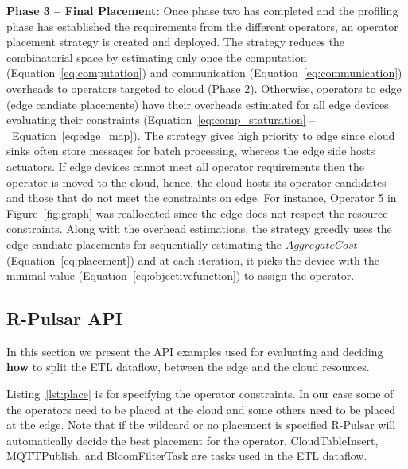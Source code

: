 \begin{algorithm}[ht]
{  
  
    
  
}

\end{algorithm}

\textbf{Phase 3 -- Final Placement:} 
Once phase two has completed and the profiling phase has established the requirements from the different operators, an operator placement strategy is created and deployed. The strategy reduces the combinatorial space by estimating only once the computation (Equation~\ref{eq:computation}) and communication (Equation~\ref{eq:communication}) overheads to operators targeted to cloud (Phase 2). Otherwise, operators to edge (edge candiate placements) have their overheads estimated for all edge devices evaluating their constraints (Equation~\ref{eq:comp_staturation} --~Equation~\ref{eq:edge_map}). The strategy gives high priority to edge since cloud sinks often store messages for batch processing, whereas the edge side hosts actuators.
If edge devices cannot meet all operator requirements then the operator is moved to the cloud, hence, the cloud hosts its operator candidates and those that do not meet the constraints on edge. For instance, Operator 5 in Figure~\ref{fig:graph} was reallocated since the edge does not respect the resource constraints. Along with the overhead estimations, the strategy greedly uses the edge candiate placements for sequentially estimating the $AggregateCost$ (Equation~\ref{eq:placement}) and at each iteration, it picks the device with the minimal value (Equation~\ref{eq:objectivefunction}) to assign the operator.

\subsection{R-Pulsar API}
\label{sec:api}
In this section we present the API examples used for evaluating and deciding \textbf{how} to split the ETL dataflow, between the edge and the cloud resources. 

Listing~\ref{lst:place} is for specifying the operator constraints. In our case some of the operators need to be placed at the cloud and some others need to be placed at the edge. Note that if the wildcard or no placement is specified R-Pulsar will automatically decide the best placement for the operator. CloudTableInsert, MQTTPublish, and BloomFilterTask are tasks used in the ETL dataflow.

